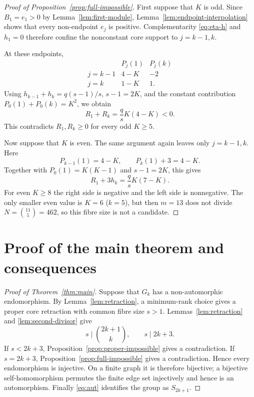 \documentclass[11pt]{article}
\theoremstyle{plain}
\theoremstyle{remark}
\begin{document}
\begin{proof}[Proof of Proposition~\ref{prop:full-impossible}]
First suppose that $K$ is odd.  Since $B_1=e_1>0$ by
Lemma~\ref{lem:first-module}, Lemma~\ref{lem:endpoint-interpolation} shows that
every non-endpoint $e_j$ is positive.  Complementarity
\eqref{eq:eta-h} and $h_1=0$ therefore confine the nonconstant core support
to $j=k-1,k$.

At these endpoints,
\[
\begin{array}{c|cc}
 &P_j(1)&P_j(k)\\ \hline
 j=k-1&4-K&-2\\
 j=k&1-K&1 .
\end{array}
\]
Using $h_{k-1}+h_k=q(s-1)/s$, $s-1=2K$, and the constant contribution
$P_0(1)+P_0(k)=K^2$, we obtain
\begin{equation}\label{eq:odd-core-identity}
 R_1+R_k=\frac qsK(4-K)<0.
\end{equation}
This contradicts $R_1,R_k\ge0$ for every odd $K\ge5$.

Now suppose that $K$ is even.  The same argument again leaves only
$j=k-1,k$.  Here
\[
 P_{k-1}(1)=4-K,\qquad P_k(1)+3=4-K.
\]
Together with $P_0(1)=K(K-1)$ and $s-1=2K$, this gives
\begin{equation}\label{eq:even-core-identity}
 R_1+3h_k=\frac qsK(7-K).
\end{equation}
For even $K\ge8$ the right side is negative and the left side is
nonnegative.  The only smaller even value is $K=6$ ($k=5$), but then
$m=13$ does not divide $N=\binom{11}{5}=462$, so this fibre size is not a
candidate.
\end{proof}

\section{Proof of the main theorem and consequences}

\begin{proof}[Proof of Theorem~\ref{thm:main}]
Suppose that $G_k$ has a non-automorphic endomorphism.  By
Lemma~\ref{lem:retraction}, a minimum-rank choice gives a proper core
retraction with common fibre size $s>1$.  Lemmas~\ref{lem:retraction} and
\ref{lem:second-divisor} give
\[
 s\mid\binom{2k+1}{k},\qquad s\mid 2k+3.
\]
If $s<2k+3$, Proposition~\ref{prop:proper-impossible} gives a
contradiction.  If $s=2k+3$, Proposition~\ref{prop:full-impossible} gives
a contradiction.  Hence every endomorphism is injective.  On a finite
graph it is therefore bijective; a bijective self-homomorphism permutes the
finite edge set injectively and hence is an automorphism.  Finally
\eqref{eq:aut} identifies the group as $S_{2k+1}$.
\end{proof}
\end{document}
